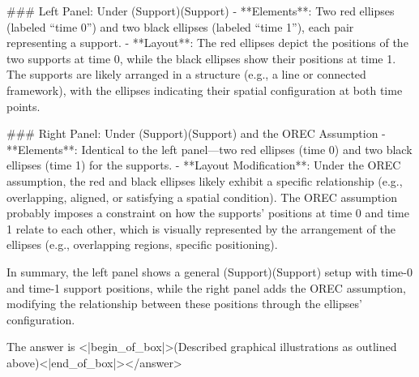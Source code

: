 ### Left Panel: Under (Support)(Support)  
- **Elements**: Two red ellipses (labeled “time 0”) and two black ellipses (labeled “time 1”), each pair representing a support.  
- **Layout**: The red ellipses depict the positions of the two supports at time 0, while the black ellipses show their positions at time 1. The supports are likely arranged in a structure (e.g., a line or connected framework), with the ellipses indicating their spatial configuration at both time points.    

### Right Panel: Under (Support)(Support) and the OREC Assumption  
- **Elements**: Identical to the left panel—two red ellipses (time 0) and two black ellipses (time 1) for the supports.  
- **Layout Modification**: Under the OREC assumption, the red and black ellipses likely exhibit a specific relationship (e.g., overlapping, aligned, or satisfying a spatial condition). The OREC assumption probably imposes a constraint on how the supports’ positions at time 0 and time 1 relate to each other, which is visually represented by the arrangement of the ellipses (e.g., overlapping regions, specific positioning).    

In summary, the left panel shows a general (Support)(Support) setup with time-0 and time-1 support positions, while the right panel adds the OREC assumption, modifying the relationship between these positions through the ellipses’ configuration.  

The answer is <|begin_of_box|>(Described graphical illustrations as outlined above)<|end_of_box|></answer>